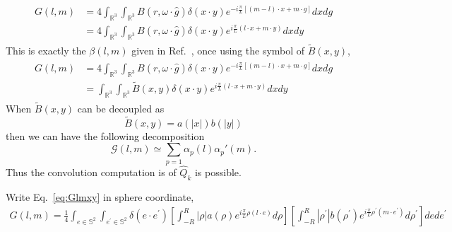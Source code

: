 \documentclass[11pt]{amsart}
\begin{document}
\begin{align*}
\begin{split}
G(l,m) &= 4\int_{\mathbb{R}^3}\int_{\mathbb{R}^3} B(r,\omega \cdot \hat g)  \delta(x\cdot y) e^{-i\frac{\pi}{L}\left[(m-l)\cdot x + m\cdot g\right]} dx dg \\
&= 4\int_{\mathbb{R}^3}\int_{\mathbb{R}^3} B(r,\omega \cdot \hat g)  \delta(x\cdot y) e^{i\frac{\pi}{L}(l\cdot x + m\cdot y)} dx dy 
\end{split}
\end{align*}
This is exactly the $\beta(l,m)$ given in Ref.~\cite{mouhotFastAlgorithmsComputing2006}, once using the symbol of $\tilde B(x,y)$,
\begin{align}
\begin{split}
G(l,m) &= 4\int_{\mathbb{R}^3}\int_{\mathbb{R}^3} B(r,\omega \cdot \hat g)  \delta(x\cdot y) e^{-i\frac{\pi}{L}\left[(m-l)\cdot x + m\cdot g\right]} dx dg \\
&= \int_{\mathbb{R}^3}\int_{\mathbb{R}^3} \tilde B(x,y)  \delta(x\cdot y) e^{i\frac{\pi}{L}(l\cdot x + m\cdot y)} dx dy 
\end{split}
\label{eq:Glmxy}
\end{align}
When $\tilde B(x,y)$ can be decoupled as
\begin{equation*}
\tilde B(x,y) = a(|x|)b(|y|)
\end{equation*} 
then we can have the following decomposition
\begin{equation*}
\mathcal{G}(l,m)  \simeq  \sum_{p=1}\alpha_p(l)\alpha_p'(m).
\end{equation*}
Thus the convolution computation is of $\hat Q_k$ is possible.

Write Eq.~\eqref{eq:Glmxy} in sphere coordinate,
\begin{multline}
G(l, m)=\frac{1}{4} \int_{e \in \mathbb{S}^{2}} \int_{e^{\prime} \in \mathbb{S}^{2}} \delta\left(e \cdot e^{\prime}\right) 
\left[\int_{-R}^{R}|\rho| a(\rho) e^{i \frac{\pi}{L} \rho(l \cdot e)} d \rho\right]\left[\int_{-R}^{R}\left|\rho^{\prime}\right| b\left(\rho^{\prime}\right) e^{i \frac{\pi}{L}\rho^{\prime}\left(m \cdot e^{\prime}\right)} d \rho^{\prime}\right] d e d e^{\prime}
\end{multline}
\end{document}
